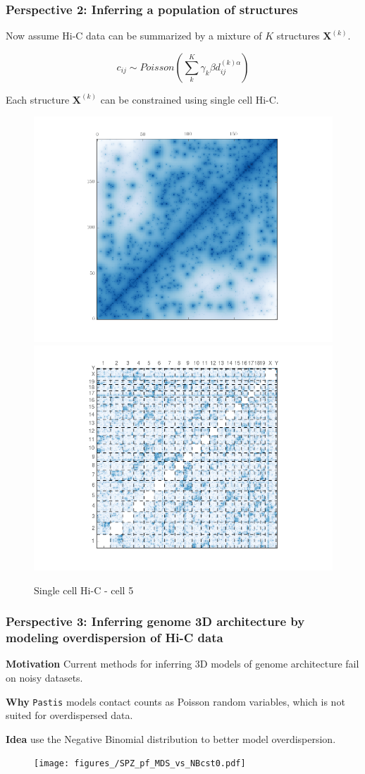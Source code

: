 \documentclass[xcolor=dvipsnames]{beamer}
\begin{document}
\begin{frame}
\frametitle{Perspective 2: Inferring a population of structures}

Now assume Hi-C data can be summarized by a mixture of $K$ structures
$\mathbf{X}^{(k)}$.

\begin{equation*}
c_{ij} \sim Poisson(\sum_{k}^{K} \gamma_k \beta d^{(k)\alpha}_{ij}) 
\end{equation*}

Each structure $\mathbf{X}^{(k)}$ can be constrained using single cell Hi-C.

\begin{figure}
\includegraphics[width=0.4\linewidth]{figures_/chr1_cell5.png}
\includegraphics[width=0.4\linewidth]{figures_/all_chr_cell5.png}
\caption{Single cell Hi-C - cell 5 \citep{nagano:single-cell}}
\end{figure}
\end{frame}

\begin{frame}
\frametitle{Perspective 3: Inferring genome 3D architecture by modeling
overdispersion of Hi-C data}

{\bf \color{Blue} Motivation} Current methods for inferring 3D models of genome
architecture fail on noisy datasets.

\vspace{1em}
{\bf \color{Blue} Why} \texttt{Pastis} models contact counts as Poisson random variables,
which is {\color {Blue}} not suited for overdispersed data.

\vspace{1em}
{\bf \color{Blue} Idea} use the Negative Binomial distribution to better
model overdispersion.

\begin{figure}
\texttt{[image: figures\_/SPZ\_pf\_MDS\_vs\_NBcst0.pdf]}
\end{figure}
\end{frame}
\end{document}
